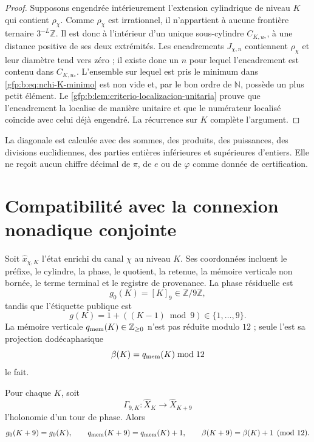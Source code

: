 \begin{proof}
Supposons engendrée intérieurement l’extension cylindrique de niveau \(K\) qui contient
\(\rho_\chi\). Comme \(\rho_\chi\) est irrationnel, il n’appartient à aucune
frontière ternaire \(3^{-L}\mathbb Z\). Il est donc à l’intérieur d’un
unique sous-cylindre \(C_{K,u_*}\), à une distance positive de ses deux extrémités.
Les encadrements \(J_{\chi,n}\) contiennent \(\rho_\chi\) et leur diamètre
tend vers zéro ; il existe donc un \(n\) pour lequel l’encadrement est
contenu dans \(C_{K,u_*}\). L’ensemble sur lequel est pris le minimum dans
\eqref{gfp:b:eq:nchi-K-minimo} est non vide et, par le bon ordre de
\(\mathbb N\), possède un plus petit élément. Le
\cref{gfp:b:lem:criterio-localizacion-unitaria} prouve que l’encadrement la
localise de manière unitaire et que le numérateur localisé coïncide avec celui déjà
engendré. La récurrence sur \(K\) complète l’argument.
\end{proof}

\begin{corollary}
La diagonale est calculée avec des sommes, des produits, des puissances, des divisions euclidiennes,
des parties entières inférieures et supérieures d’entiers. Elle ne reçoit aucun chiffre décimal de \(\pi\), de \(e\) ou de
\(\varphi\) comme donnée de certification.
\end{corollary}

\section{Compatibilité avec la connexion nonadique conjointe}

Soit \(\widehat x_{\chi,K}\) l’état enrichi du canal \(\chi\) au
niveau \(K\). Ses coordonnées incluent le préfixe, le cylindre, la phase,
le quotient, la retenue, la mémoire verticale non bornée, le terme terminal
et le registre de provenance. La phase résiduelle est
\[
 g_0(K)=[K]_9\in\mathbb Z/9\mathbb Z,
\]
tandis que l’étiquette publique est
\[
 g(K)=1+((K-1)\bmod9)\in\{1,\ldots,9\}.
\]
La mémoire verticale \(q_{\rm mem}(K)\in\mathbb Z_{\geq0}\) n’est pas réduite
modulo \(12\) ; seule l’est sa projection dodécaphasique
\[
 \beta(K)=q_{\rm mem}(K)\bmod12
\]
le fait.

Pour chaque \(K\), soit
\[
 \Gamma_{9,K}:\widehat X_K\longrightarrow\widehat X_{K+9}
\]
l’holonomie d’un tour de phase. Alors
\[
 g_0(K+9)=g_0(K),
 \qquad
 q_{\rm mem}(K+9)=q_{\rm mem}(K)+1,
 \qquad
 \beta(K+9)=\beta(K)+1\pmod{12}.
\]

